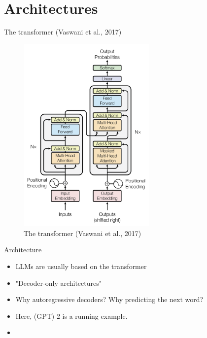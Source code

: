 \documentclass[10pt]{beamer}
\begin{document}
\section{Architectures}

\begin{frame}{The transformer (Vaswani et al., 2017)}

\begin{figure}[h]
\centering
\includegraphics[width=0.6\textwidth]{fig/Vaswani_1_transformer}
\caption{The transformer (Vaswani et al., 2017)}
\end{figure}

\end{frame}


\begin{frame}{Architecture}

\begin{itemize}
\item LLMs are usually based on the transformer 
\item "Decoder-only architectures"
\item Why autoregressive decoders? Why predicting the next word?
\item Here,  (GPT) 2 is a running example.
\item
\end{itemize}

\end{frame}
\end{document}
